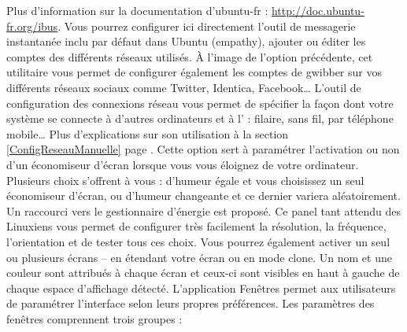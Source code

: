 Plus d'information sur la documentation d'ubuntu-fr : \url{http://doc.ubuntu-fr.org/ibus}.
Vous pourrez configurer ici directement l'outil de messagerie instantanée inclu par défaut dans Ubuntu (empathy), ajouter ou éditer les comptes des différents réseaux utilisés.
À l'image de l'option précédente, cet utilitaire vous permet de configurer également les comptes de gwibber sur vos différents réseaux sociaux comme Twitter, Identica, Facebook\ldots{}
L'outil de configuration des connexions réseau vous permet de spécifier la façon dont votre système se connecte à d'autres ordinateurs et à l' : filaire, sans fil, par téléphone mobile\ldots{} Plus d'explications sur son utilisation à la section \ref{ConfigReseauManuelle} page \pageref{ConfigReseauManuelle}.
Cette option sert à paramétrer l'activation ou non d'un économiseur d'écran lorsque vous vous éloignez de votre ordinateur. Plusieurs choix s'offrent à vous : d'humeur égale et vous choisissez un seul économiseur d’écran, ou d'humeur changeante et ce dernier variera aléatoirement. Un raccourci vers le gestionnaire d'énergie est proposé.
Ce panel tant attendu des Linuxiens vous permet de configurer très facilement la résolution, la fréquence, l'orientation et de tester tous ces choix. Vous pourrez également activer un seul ou plusieurs écrans -- en étendant votre écran ou en mode clone. Un nom et une couleur sont attribués à chaque écran et ceux-ci sont visibles en haut à gauche de chaque espace d'affichage détecté.
L'application Fenêtres permet aux utilisateurs de paramétrer l'interface selon leurs propres préférences. Les paramètres des fenêtres comprennent trois groupes : 
